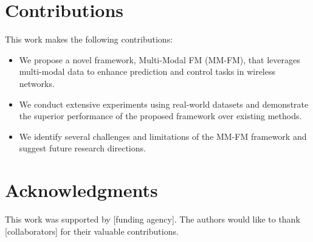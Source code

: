 \documentclass{article}
\begin{document}
\section{Contributions}
This work makes the following contributions:
\begin{itemize}
    \item We propose a novel framework, Multi-Modal FM (MM-FM), that leverages multi-modal data to enhance prediction and control tasks in wireless networks.
    \item We conduct extensive experiments using real-world datasets and demonstrate the superior performance of the proposed framework over existing methods.
    \item We identify several challenges and limitations of the MM-FM framework and suggest future research directions.
\end{itemize}

\section*{Acknowledgments}
This work was supported by [funding agency]. The authors would like to thank [collaborators] for their valuable contributions.



\end{document}
